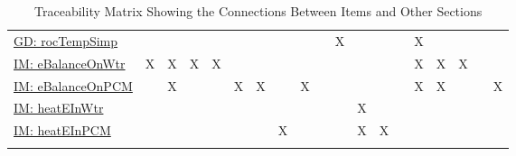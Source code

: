 \documentclass[12pt]{article}
\begin{document}
\begin{longtable}{l l l l l l l l l l l l l l l l l l l}
\\
\hyperref[GD:rocTempSimp]{GD: rocTempSimp} &  &  &  &  &  &  &  &  &  & X &  &  &  & X &  &  &  & 
\\
\hyperref[IM:eBalanceOnWtr]{IM: eBalanceOnWtr} & X & X & X & X &  &  &  &  &  &  &  &  &  & X & X & X &  & 
\\
\hyperref[IM:eBalanceOnPCM]{IM: eBalanceOnPCM} &  & X &  &  & X & X &  & X &  &  &  &  &  & X & X &  &  & X
\\
\hyperref[IM:heatEInWtr]{IM: heatEInWtr} &  &  &  &  &  &  &  &  &  &  & X &  &  &  &  &  &  & 
\\
\hyperref[IM:heatEInPCM]{IM: heatEInPCM} &  &  &  &  &  &  & X &  &  &  & X & X &  &  &  &  &  & 
\\
\bottomrule
\caption{Traceability Matrix Showing the Connections Between Items and Other Sections}
\label{Table:TraceMatRefvsRef}
\end{longtable}
\end{document}
